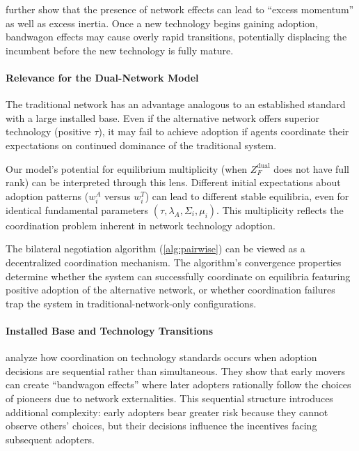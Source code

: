 further show that the presence of network effects can lead to ``excess momentum'' as well as excess inertia. Once a new technology begins gaining adoption, bandwagon effects may cause overly rapid transitions, potentially displacing the incumbent before the new technology is fully mature.

\paragraph{Relevance for the Dual-Network Model}

The traditional network has an advantage analogous to an established standard with a large installed base. Even if the alternative network offers superior technology (positive $\tau$), it may fail to achieve adoption if agents coordinate their expectations on continued dominance of the traditional system.

Our model's potential for equilibrium multiplicity (when $Z_F^{\text{dual}}$ does not have full rank) can be interpreted through this lens. Different initial expectations about adoption patterns ($w_i^A$ versus $w_i^T$) can lead to different stable equilibria, even for identical fundamental parameters $(\tau, \lambda_A, \Sigma_i, \mu_i)$. This multiplicity reflects the coordination problem inherent in network technology adoption.

The bilateral negotiation algorithm (\ref{alg:pairwise}) can be viewed as a decentralized coordination mechanism. The algorithm's convergence properties determine whether the system can successfully coordinate on equilibria featuring positive adoption of the alternative network, or whether coordination failures trap the system in traditional-network-only configurations.

\paragraph{Installed Base and Technology Transitions}

 analyze how coordination on technology standards occurs when adoption decisions are sequential rather than simultaneous. They show that early movers can create ``bandwagon effects'' where later adopters rationally follow the choices of pioneers due to network externalities. This sequential structure introduces additional complexity: early adopters bear greater risk because they cannot observe others' choices, but their decisions influence the incentives facing subsequent adopters.

